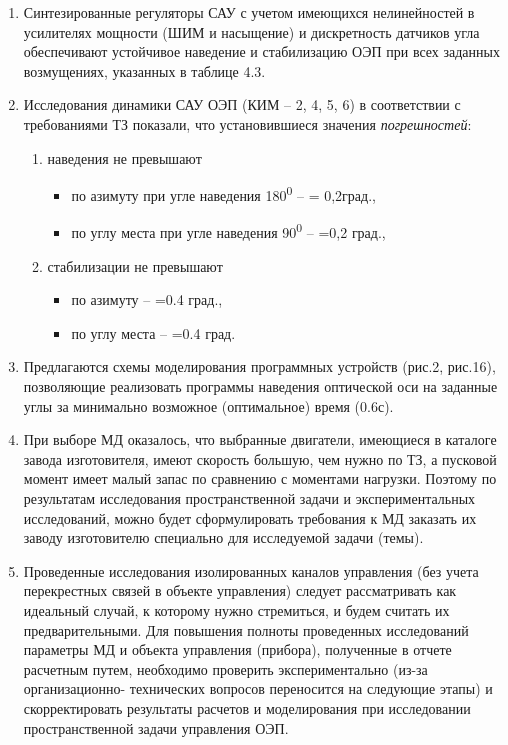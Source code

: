 \begin{enumerate}
	\item Синтезированные регуляторы САУ с учетом имеющихся нелинейностей в усилителях мощности (ШИМ и насыщение) и дискретность датчиков угла обеспечивают устойчивое наведение и стабилизацию ОЭП при всех заданных возмущениях, указанных в таблице 4.3.
	\item Исследования динамики САУ ОЭП (КИМ – 2, 4, 5, 6) в соответствии с требованиями ТЗ показали, что установившиеся значения \textit{погрешностей}: \par
	\begin{enumerate}
		\item наведения не превышают
		\begin{itemize}
			\item по азимуту при угле наведения 180\textsuperscript{0 } –  = 0,2град.,
			\item по углу места при угле наведения 90\textsuperscript{0} –  =0,2 град.,
		\end{itemize}
		\item стабилизации не превышают
		\begin{itemize}
			\item по азимуту –  =0.4 град.,
			\item по углу места –  =0.4 град.
		\end{itemize}
	\end{enumerate}	
	\item Предлагаются схемы моделирования программных устройств (рис.2, рис.16), позволяющие реализовать программы наведения оптической оси на заданные углы за минимально возможное (оптимальное) время (0.6с).
	\item При выборе МД оказалось, что выбранные двигатели, имеющиеся в каталоге завода изготовителя, имеют скорость большую, чем нужно по ТЗ, а пусковой момент имеет малый запас по сравнению с моментами нагрузки. Поэтому по результатам исследования пространственной задачи и экспериментальных исследований, можно будет сформулировать требования к МД заказать их заводу изготовителю специально для исследуемой задачи (темы).
	\item Проведенные исследования изолированных каналов управления (без учета перекрестных связей в объекте управления) следует рассматривать как идеальный случай, к которому нужно стремиться, и будем считать их предварительными. Для повышения полноты проведенных исследований параметры МД и объекта управления (прибора), полученные в отчете расчетным путем, необходимо проверить экспериментально (из-за организационно- технических вопросов переносится на следующие этапы) и скорректировать результаты расчетов и моделирования при исследовании пространственной задачи управления ОЭП.
\end{enumerate}
\clearpage
